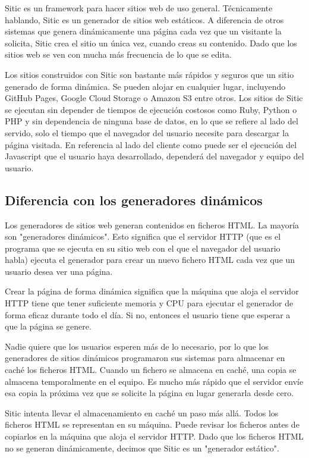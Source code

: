 \documentclass[a4paper,12pt]{article}
\begin{document}
Sitic es un framework para hacer sitios web de uso general. Técnicamente hablando, Sitic es un generador de sitios web estáticos.
A diferencia de otros sistemas que genera dinámicamente una página cada vez que un visitante la solicita, Sitic crea el sitio
un única vez,
cuando creas su contenido. Dado que los sitios web se ven con mucha más frecuencia de lo que se edita.

Los sitios construidos con Sitic son bastante más rápidos y seguros que un sitio generado de forma dinámica.
Se pueden alojar en cualquier lugar, incluyendo GitHub Pages, Google Cloud Storage o Amazon
S3 entre otros. Los sitios de Sitic se ejecutan sin depender de tiempos de ejecución costosos como Ruby, Python
o PHP y sin dependencia de ninguna base de datos, en lo que se refiere al lado del servido, solo el tiempo
que el navegador del usuario necesite para descargar la página visitada. En referencia al lado
del cliente como puede ser el ejecución del Javascript que el usuario haya desarrollado, dependerá del navegador y
equipo del usuario.

\subsection{Diferencia con los generadores dinámicos}

Los generadores de sitios web generan contenidos en ficheros HTML. La mayoría son "generadores dinámicos".
Esto significa que el servidor HTTP (que es el programa que se ejecuta en su sitio web con el que el navegador del
usuario habla) ejecuta el generador para crear un nuevo fichero HTML cada vez que un usuario desea ver una página.

Crear la página de forma dinámica significa que la máquina que aloja el servidor HTTP tiene que tener suficiente
memoria y CPU para ejecutar el generador de forma eficaz durante todo el día. Si no, entonces el usuario tiene que
esperar a que la página se genere.

Nadie quiere que los usuarios esperen más de lo necesario, por lo que los generadores de sitios dinámicos programaron
sus sistemas para almacenar en caché los ficheros HTML. Cuando un fichero se almacena en caché, una copia se
almacena temporalmente en el equipo. Es mucho más rápido que el servidor envíe esa copia la próxima vez que
se solicite la página en lugar generarla desde cero.

Sitic intenta llevar el almacenamiento en caché un paso más allá. Todos los ficheros HTML se representan en su máquina.
Puede revisar los ficheros antes de copiarlos en la máquina que aloja el servidor HTTP. Dado que los ficheros HTML
no se generan dinámicamente, decimos que Sitic es un "generador estático".
\end{document}
